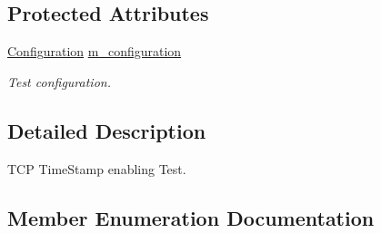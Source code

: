 \subsection*{Protected Attributes}
\begin{DoxyCompactItemize}
\item 
\hyperlink{classTimestampTestCase_a98399735307f2da16757d48f88ebbd6a}{Configuration} \hyperlink{classTimestampTestCase_a23ae1fc181bfd5b913f6b8219349e23c}{m\+\_\+configuration}
\begin{DoxyCompactList}\small\item\em Test configuration. \end{DoxyCompactList}\end{DoxyCompactItemize}


\subsection{Detailed Description}
T\+CP Time\+Stamp enabling Test. 

\subsection{Member Enumeration Documentation}
